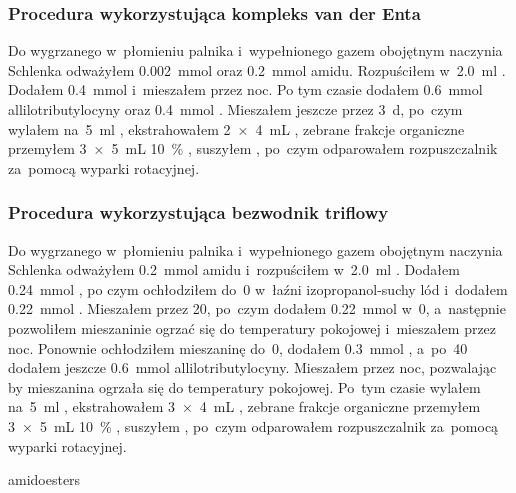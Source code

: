 \subsubsection{Procedura wykorzystująca kompleks van der Enta}
Do wygrzanego w~płomieniu palnika i~wypełnionego gazem obojętnym naczynia Schlenka odważyłem
  \SI{0.002}{\mmol}  oraz \SI{0.2}{\mmol} amidu.
Rozpuściłem w~\SI{2.0}{\ml} .
Dodałem \SI{0.4}{\mmol}  i~mieszałem przez noc.
Po tym czasie dodałem \SI{0.6}{\mmol} allilotributylocyny oraz \SI{0.4}{\mmol} .
Mieszałem jeszcze przez \SI{3}{\day}, po~czym wylałem na~\SI{5}{\ml} ,
  ekstrahowałem \SI[product-units = single]{2 x 4}{\mL} , zebrane frakcje organiczne
  przemyłem \SI[product-units = single]{3 x 5}{\mL} \SI{10}{\percent} ,
  suszyłem , po~czym odparowałem rozpuszczalnik za~pomocą wyparki rotacyjnej.

\subsubsection{Procedura wykorzystująca bezwodnik triflowy}
Do wygrzanego w~płomieniu palnika i~wypełnionego gazem obojętnym naczynia Schlenka odważyłem
  \SI{0.2}{\mmol} amidu i~rozpuściłem w~\SI{2.0}{\ml} .
Dodałem \SI{0.24}{\mmol} , po czym ochłodziłem do~\SI{0}{\degC}
  w~łaźni izopropanol-suchy lód i~dodałem \SI{0.22}{\mmol} .
Mieszałem przez \SI{20}{\min}, po~czym dodałem \SI{0.22}{\mmol}  w~\SI{0}{\degC},
  a~następnie pozwoliłem mieszaninie ogrzać się do temperatury pokojowej i~mieszałem przez noc.
Ponownie ochłodziłem mieszaninę do~\SI{0}{\degC}, dodałem \SI{0.3}{\mmol} ,
  a~po~\SI{40}{\min} dodałem jeszcze \SI{0.6}{\mmol} allilotributylocyny.
Mieszałem przez noc, pozwalając by mieszanina ogrzała się do temperatury pokojowej.
Po~tym czasie wylałem na~\SI{5}{\ml} ,
  ekstrahowałem \SI[product-units = single]{3 x 4}{\mL} , zebrane frakcje organiczne
  przemyłem \SI[product-units = single]{3 x 5}{\mL} \SI{10}{\percent} ,
  suszyłem , po~czym odparowałem rozpuszczalnik za~pomocą wyparki rotacyjnej.

{amidoesters}
